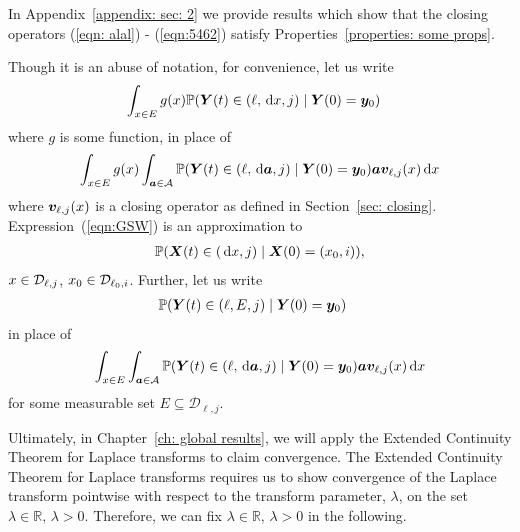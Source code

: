 In Appendix~\ref{appendix: sec: 2} we provide results which show that the closing operators (\ref{eqn: alal}) - (\ref{eqn:5462}) satisfy Properties~\ref{properties: some props}. 

Though it is an abuse of notation, for convenience, let us write 
\begin{align*}
	& \int_{x\in E}g(x)\mathbb P({\boldsymbol Y}(t) \in (\ell,\, \mathrm{d} x, j)\mid \boldsymbol Y(0)=\boldsymbol y_0 )
\end{align*}
where \(g\) is some function, in place of 
\begin{align}
	\int_{x\in E}g(x)\int_{\boldsymbol a \in\mathcal A}\mathbb P({\boldsymbol Y}(t) \in (\ell,\, \mathrm{d} \boldsymbol a, j)\mid \boldsymbol Y(0)=\boldsymbol y_0)\boldsymbol a\boldsymbol v_{\ell,j}(x)\, \mathrm{d} x \label{eqn:GSW}
\end{align}
where \(\boldsymbol v_{\ell,j}(x)\) is a closing operator as defined in Section~\ref{sec: closing}. Expression~(\ref{eqn:GSW}) is an approximation to 
\begin{align}
	\mathbb P(\boldsymbol X(t)\in(\, \mathrm{d} x, j)\mid \boldsymbol X(0)=(x_0, i)),
\end{align}
\(x\in \mathcal{D}_{\ell,j}\), \(x_0\in\mathcal{D}_{\ell_0,i}\).
Further, let us write 
\begin{align*}
	& \mathbb P({\boldsymbol Y} (t) \in (\ell,E, j)\mid \boldsymbol Y (0)=\boldsymbol y_0 )
\end{align*}
in place of 
\begin{align}
	\int_{x\in E}\int_{\boldsymbol a \in\mathcal A}\mathbb P({\boldsymbol Y} (t) \in (\ell,\, \mathrm{d} \boldsymbol a, j)\mid \boldsymbol Y (0)=\boldsymbol y_0  )\boldsymbol a\boldsymbol v_{\ell,j}(x)\, \mathrm{d} x \label{eqn:GSW2}
\end{align}
for some measurable set \(E\subseteq \mathcal D_{\ell,j}\). 

Ultimately, in Chapter~\ref{ch: global results}, we will apply the Extended Continuity Theorem for Laplace transforms \cite[Chapter XIII, Theorem 2a]{feller1957} to claim convergence. The Extended Continuity Theorem for Laplace transforms requires us to show convergence of the Laplace transform pointwise with respect to the transform parameter, \(\lambda\), on the set \(\lambda\in\mathbb R,\, \lambda>0\). Therefore, we can fix \(\lambda\in\mathbb R,\, \lambda>0\) in the following. 

